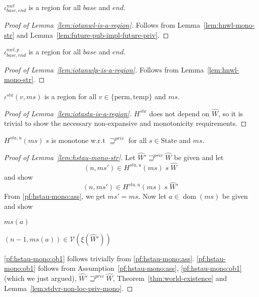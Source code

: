 \documentclass[a4paper]{article}
\DeclareMathOperator{\dom}{dom}
\newcommand{\var}[1]{\mathit{#1}}
\newcommand{\hs}{\var{ms}}
\newcommand{\ms}{\hs}
\newcommand{\addr}{\var{a}}
\newcommand{\start}{\var{base}}
\newcommand{\addrend}{\var{end}}
\newcommand{\nwl}{\var{nwl}}
\newcommand{\sta}{\var{sta}}
\newcommand{\futurestr}{\mathbin{\sqsupseteq}^{\var{priv}}}
\newcommand{\asmType}{\plaindom{AsmType}}
\newcommand{\plaindom}[1]{\mathrm{#1}}
\newcommand{\States}{\plaindom{State}}
\newcommand{\intr}[2]{\mathcal{#1}}
\newcommand{\valueintr}[1]{\intr{V}{#1}}
\newcommand{\stdvr}{\valueintr{\asmType}}
\newcommand{\npair}[2][n]{\left(#1,#2 \right)}
\newcommand{\plainview}[1]{\mathrm{#1}}
\newcommand{\perma}{\plainview{perm}}
\newcommand{\temp}{\plainview{temp}}
\newcommand{\nonlocal}[1]{\ensuremath{#1} \text{ is non-local}}
\begin{document}
\begin{lemma}
  \label{lem:iotanwl-is-a-region}
  $\iota^\nwl_{\start,\addrend}$ is a region for all $\start$ and $\addrend$.
\end{lemma}
\begin{proof}[Proof of Lemma~\ref{lem:iotanwl-is-a-region}]
  Follows from Lemma~\ref{lem:hnwl-mono-str} and Lemma~\ref{lem:future-pub-impl-future-priv}.
\end{proof}

\begin{lemma}
  \label{lem:iotanwlp-is-a-region}
  $\iota^{\nwl,p}_{\start,\addrend}$ is a region for all $\start$ and $\addrend$.
\end{lemma}
\begin{proof}[Proof of Lemma~\ref{lem:iotanwlp-is-a-region}]
  Follows from Lemma~\ref{lem:hnwl-mono-str}.
\end{proof}

\begin{lemma}
  \label{lem:iotasta-is-a-region}
  $\iota^\sta(v,\ms)$ is a region for all $v \in \{\perma, \temp\}$ and $\ms$.
\end{lemma}
\begin{proof}[Proof of Lemma~\ref{lem:iotasta-is-a-region}]
  $H^\sta$ does not depend on $\hat{W}$, so it is trivial to show the necessary non-expansive and monotonicity requirements.
\end{proof}

\begin{lemma}
  \label{lem:hstau-mono-str}
  $H^{\sta,u}(\ms) \; s$ is monotone w.r.t $\futurestr$ for all $s \in \States$ and $\ms$.
\end{lemma}
\begin{proof}[Proof of Lemma~\ref{lem:hstau-mono-str}]
  Let $\hat{W}' \futurestr \hat{W}$ be given and let 
  \begin{equation}
    \label{pf:hstau-mono:ass}
    \npair{\ms'} \in H^{\sta,u}(\ms)\; s \; \hat{W}
  \end{equation}
  and show
  \[
    \npair{\ms'} \in H^{\sta,u}(\ms)\; s \; \hat{W}'
  \]
  From \ref{pf:hstau-mono:ass}, we get $\ms' = \ms$. Now let $\addr \in \dom(\ms)$ be given and show
  \begin{enumproof}
    \item \nonlocal{\ms(a)} \label{pf:hstau-mono:ob1}
    \item $\npair[n-1]{\ms(a)} \in \stdvr(\xi(\hat{W}'))$ \label{pf:hstau-mono:ob2}
  \end{enumproof}
  \ref{pf:hstau-mono:ob1} follows trivially from \ref{pf:hstau-mono:ass}. \ref{pf:hstau-mono:ob1} follows from Assumption~\ref{pf:hstau-mono:ass}, \ref{pf:hstau-mono:ob1} (which we just argued), $\hat{W}' \futurestr \hat{W}$, Theorem~\ref{thm:world-existence} and Lemma~\ref{lem:stdvr-non-loc-priv-mono}.
\end{proof}
\end{document}
